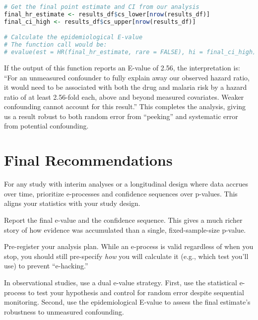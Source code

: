 \documentclass[11pt]{article}
\begin{document}
\begin{lstlisting}[language=R]
# Get the final point estimate and CI from our analysis
final_hr_estimate <- results_df$cs_lower[nrow(results_df)]
final_ci_high <- results_df$cs_upper[nrow(results_df)]

# Calculate the epidemiological E-value
# The function call would be:
# evalue(est = HR(final_hr_estimate, rare = FALSE), hi = final_ci_high)
\end{lstlisting}
If the output of this function reports an E-value of 2.56, the interpretation is: ``For an unmeasured confounder to fully explain away our observed hazard ratio, it would need to be associated with both the drug and malaria risk by a hazard ratio of at least 2.56-fold each, above and beyond measured covariates. Weaker confounding cannot account for this result.'' This completes the analysis, giving us a result robust to both random error from ``peeking'' and systematic error from potential confounding.

\section*{Final Recommendations}
\begin{notebox}
For any study with interim analyses or a longitudinal design where data accrues over time, prioritize e-processes and confidence sequences over p-values. This aligns your statistics with your study design.
\end{notebox}

\begin{notebox}
Report the final e-value and the confidence sequence. This gives a much richer story of how evidence was accumulated than a single, fixed-sample-size p-value.
\end{notebox}

\begin{notebox}
Pre-register your analysis plan. While an e-process is valid regardless of when you stop, you should still pre-specify \textit{how} you will calculate it (e.g., which test you'll use) to prevent ``e-hacking.''
\end{notebox}

\begin{notebox}
In observational studies, use a dual e-value strategy. First, use the statistical e-process to test your hypothesis and control for random error despite sequential monitoring. Second, use the epidemiological E-value to assess the final estimate's robustness to unmeasured confounding.
\end{notebox}
\end{document}
